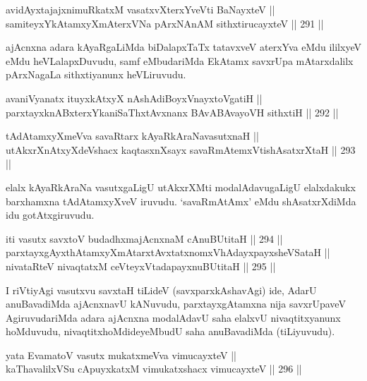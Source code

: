 \begin{shl}
avidAyxtajajxnimuRkatxM vasatxvXterxYveVti BaNayxteV || \\
samiteyxYkAtamxyXmAterxVNa pArxNAnAM sithxtirucayxteV \hfill || 291 ||  
\end{shl}	

\begin{artha}
ajAcnxna adara kAyaRgaLiMda biDalapxTaTx tatavxveV aterxYva eMdu
ililxyeV eMdu heVLalapxDuvudu, samf eMbudariMda EkAtamx savxrUpa
mAtarxdalilx pArxNagaLa sithxtiyanunx heVLiruvudu.
\end{artha}

\begin{shl}
avaniVyanatx ituyxkAtxyX nAshAdiBoyxV\s nayxtoVgatiH || \\
parxtayxknABxterxYkaniSaThxtAvxnanx BAvABAvayoVH sithxtiH \hfill || 292 ||  
\end{shl}



\begin{shl}
tAdAtamxyXmeVva savaRtarx kAyaRkAraNavasutxnaH || \\
utAkxrXnAtxyXdeVshacx kaqtasxnXsayx savaRmAtemxVtishAsatxrXtaH \hfill || 293 ||  
\end{shl}

\begin{artha}
elalx kAyaRkAraNa vasutxgaLigU utAkxrXMti modalAdavugaLigU elalxdakukx
barxhamxna tAdAtamxyXveV iruvudu. `savaRmAtAmx' eMdu shAsatxrXdiMda idu gotAtxgiruvudu.
\end{artha}

\begin{shl}
iti vasutx savxtoV budadhxmajAcnxnaM cAnuBUtitaH \hfill || 294 ||  \\
parxtayxgAyxthAtamxyXmAtarxtAvxtatxnomxVhAdayxpayxsheVSataH || \\
nivataRteV nivaqtatxM ceVteyxVtadapayxnuBUtitaH \hfill || 295 ||  
\end{shl}

\begin{artha}
I riVtiyAgi vasutxvu savxtaH tiLideV (savxparxkAshavAgi) ide, AdarU
anuBavadiMda ajAcnxnavU kANuvudu, parxtayxgAtamxna nija savxrUpaveV
AgiruvudariMda adara ajAcnxna modalAdavU saha elalxvU nivaqtitxyanunx
hoMduvudu, nivaqtitxhoMdideyeMbudU saha anuBavadiMda (tiLiyuvudu).
\end{artha}

\begin{shl}
yata EvamatoV vasutx mukatxmeVva vimucayxteV || \\
kaThavalilxVSu cApuyxkatxM vimukatxshacx vimucayxteV \hfill || 296 ||  
\end{shl}

